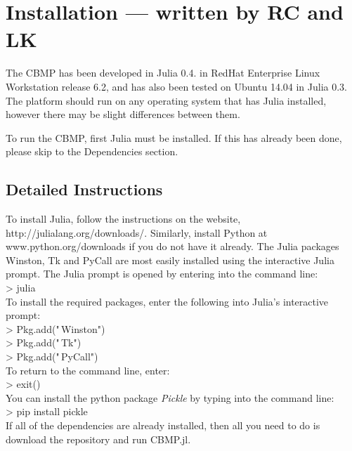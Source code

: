 \documentclass[12pt]{article}
\begin{document}
\section{Installation --- written by RC and LK}
The CBMP has been developed in Julia 0.4. in RedHat Enterprise Linux 
Workstation release 6.2, and has also been tested on Ubuntu 14.04 in 
Julia 0.3. The platform should run on any operating system 
that has Julia installed, however there may be slight differences 
between them.

To run the CBMP, first Julia must be installed. If this has already been 
done, please skip to the Dependencies section.

\subsection{Detailed Instructions}
To install Julia, follow the instructions on the website, 
http://julialang.org/downloads/. Similarly,
install Python at www.python.org/downloads if you do not have it already. 
The Julia packages Winston, Tk and PyCall are most easily installed 
using the interactive Julia prompt. The Julia prompt is opened by entering
into the command line: \\

{\fontsize{11pt}{11pt} \ttfamily 
> julia} \\

To install the required packages, enter the following into Julia's interactive prompt: \\

{\fontsize{11pt}{11pt} \ttfamily 
> Pkg.add("\,Winston") \\

> Pkg.add("\,Tk") \\

> Pkg.add("\,PyCall")} \\ 

To return to the command line, enter: \\

{\fontsize{11pt}{11pt} \ttfamily 
> exit()} \\

You can install the python package {\itshape Pickle} by typing into the command line: \\

{\fontsize{11pt}{11pt} \ttfamily 
> pip install pickle} \\

If all of the dependencies are already installed, then all you need to 
do is download the repository and run CBMP.jl.
\end{document}

